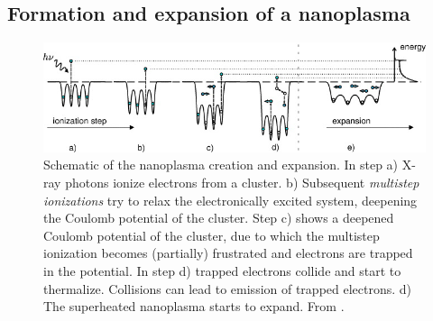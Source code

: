 \subsection{Formation and expansion of a nanoplasma}\label{sec:nanoplasma-expansion}
\begin{figure}
	\centering
		\includegraphics[width=1.00\textwidth]{images/nano-plasma-schematic.jpg}
	\caption[Schematic of the nanoplasma creation and expansion.]{Schematic of the nanoplasma creation and expansion. In step a) X-ray photons ionize electrons from a cluster. b) Subsequent \textit{multistep ionizations} try to relax the electronically excited system, deepening the Coulomb potential of the cluster. Step c) shows a deepened Coulomb potential of the cluster, due to which the multistep ionization becomes (partially) frustrated and electrons are trapped in the potential. In step d) trapped electrons collide and start to thermalize. Collisions can lead to emission of trapped electrons. d) The superheated nanoplasma starts to expand. From \citep[\href{https://creativecommons.org/licenses/by/3.0/}{\ccby}]{Arbeiter-2011-NJP}.}
	\label{fig:nano-plasma-schematic}
\end{figure}

